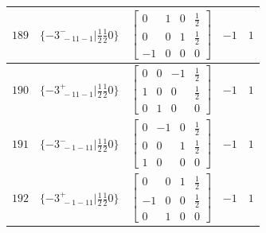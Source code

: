 \documentclass[fleqn,8pt]{jsarticle}
\begin{document}
\begin{longtable}{ccccc}
$ 189 $ & $ \{-3^{-}_{\,\,-11-1}|\frac{1}{2} \frac{1}{2} 0\} $ & $ \begin{bmatrix} 0 & 1 & 0 & \frac{1}{2} \\ 0 & 0 & 1 & \frac{1}{2} \\ -1 & 0 & 0 & 0 \end{bmatrix} $ & $ -1 $ & $ 1 $ \\ \hline
$ 190 $ & $ \{-3^{+}_{\,\,-11-1}|\frac{1}{2} \frac{1}{2} 0\} $ & $ \begin{bmatrix} 0 & 0 & -1 & \frac{1}{2} \\ 1 & 0 & 0 & \frac{1}{2} \\ 0 & 1 & 0 & 0 \end{bmatrix} $ & $ -1 $ & $ 1 $ \\ \hline
$ 191 $ & $ \{-3^{-}_{\,\,-1-11}|\frac{1}{2} \frac{1}{2} 0\} $ & $ \begin{bmatrix} 0 & -1 & 0 & \frac{1}{2} \\ 0 & 0 & 1 & \frac{1}{2} \\ 1 & 0 & 0 & 0 \end{bmatrix} $ & $ -1 $ & $ 1 $ \\ \hline
$ 192 $ & $ \{-3^{+}_{\,\,-1-11}|\frac{1}{2} \frac{1}{2} 0\} $ & $ \begin{bmatrix} 0 & 0 & 1 & \frac{1}{2} \\ -1 & 0 & 0 & \frac{1}{2} \\ 0 & 1 & 0 & 0 \end{bmatrix} $ & $ -1 $ & $ 1 $ \\
\end{longtable}
\end{document}
